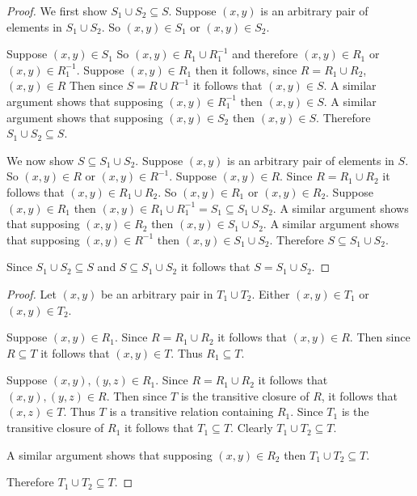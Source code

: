 \begin{proof}
    We first show $S_1 \cup S_2 \subseteq S$.
    Suppose $(x, y)$ is an arbitrary pair of elements in $S_1 \cup S_2$.
    So $(x, y) \in S_1$ or $(x, y) \in S_2$.

    Suppose $(x, y) \in S_1$
    So $(x, y) \in R_1 \cup R_1^{-1}$ and therefore $(x, y) \in R_1$ or $(x, y) \in R_1^{-1}$.
    Suppose $(x, y) \in R_1$ then it follows, since $R = R_1 \cup R_2$,
        $(x, y) \in R$
    Then since $S = R \cup R^{-1}$ it follows that $(x, y) \in S$.
    A similar argument shows that supposing $(x, y) \in R_1^{-1}$ then $(x, y) \in S$.
    A similar argument shows that supposing $(x, y) \in S_2$ then $(x, y) \in S$.
    Therefore $S_1 \cup S_2 \subseteq S$.

    We now show $S \subseteq S_1 \cup S_2$.
    Suppose $(x, y)$ is an arbitrary pair of elements in $S$.
    So $(x, y) \in R$ or $(x, y) \in R^{-1}$.
    Suppose $(x, y) \in R$.
    Since $R = R_1 \cup R_2$ it follows that
        $(x, y) \in R_1 \cup R_2$.
    So $(x, y) \in R_1$ or $(x, y) \in R_2$.
    Suppose $(x, y) \in R_1$ then $(x, y) \in R_1 \cup R_1^{-1} = S_1 \subseteq S_1 \cup S_2$.
    A similar argument shows that supposing $(x, y) \in R_2$
        then $(x, y) \in S_1 \cup S_2$.
    A similar argument shows that supposing $(x, y) \in R^{-1}$
        then $(x, y) \in S_1 \cup S_2$.
    Therefore $S \subseteq S_1 \cup S_2$.

    Since $S_1 \cup S_2 \subseteq S$ and $S \subseteq S_1 \cup S_2$ 
        it follows that $S = S_1 \cup S_2$.
\end{proof}

\begin{proof}
    Let $(x, y)$ be an arbitrary pair in $T_1 \cup T_2$.
    Either $(x, y) \in T_1$ or $(x, y) \in T_2$.

    Suppose $(x, y) \in R_1$.
    Since $R = R_1 \cup R_2$ it follows that $(x, y) \in R$.
    Then since $R \subseteq T$ it follows that $(x, y) \in T$.
    Thus $R_1 \subseteq T$.

    Suppose $(x, y), (y, z) \in R_1$.
    Since $R = R_1 \cup R_2$ it follows that $(x, y), (y, z) \in R$.
    Then since $T$ is the transitive closure of $R$, it follows that $(x, z) \in T$.
    Thus $T$ is a transitive relation containing $R_1$.
    Since $T_1$ is the transitive closure of $R_1$ it follows that $T_1 \subseteq T$.
    Clearly $T_1 \cup T_2 \subseteq T$.

    A similar argument shows that supposing $(x, y) \in R_2$
    then $T_1 \cup T_2 \subseteq T$.

    Therefore $T_1 \cup T_2 \subseteq T$.
\end{proof}

